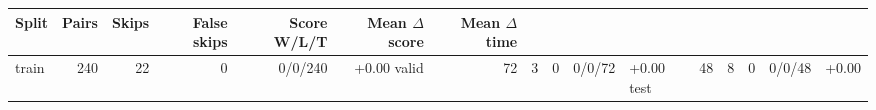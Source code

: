 \begin{tabular}{lrrrrrr}
\toprule
Split & Pairs & Skips & False skips & Score W/L/T & Mean $\Delta$ score & Mean $\Delta$ time \\
\midrule
train & 240 & 22 & 0 & 0/0/240 & +0.00%
valid & 72 & 3 & 0 & 0/0/72 & +0.00%
test & 48 & 8 & 0 & 0/0/48 & +0.00%
\bottomrule
\end{tabular}
